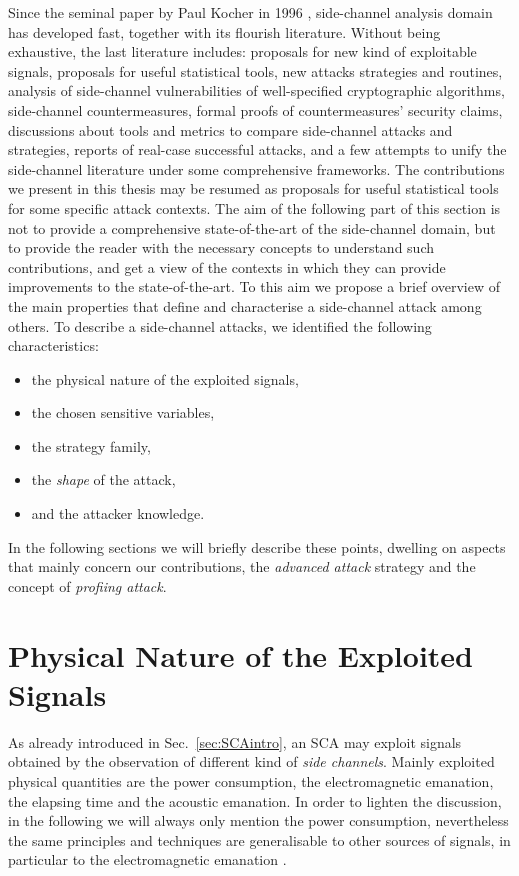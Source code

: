 Since the seminal paper by Paul Kocher in 1996 \cite{kocher1996timing}, side-channel analysis domain has developed fast, together with its flourish literature. Without being exhaustive, the last literature includes: proposals for new kind of exploitable signals, proposals for useful statistical tools, new attacks strategies and routines, analysis of side-channel vulnerabilities of well-specified cryptographic algorithms, side-channel countermeasures, formal proofs of countermeasures' security claims, discussions about tools and metrics to compare side-channel attacks and strategies, reports of real-case successful attacks, and a few attempts to unify the side-channel literature under some comprehensive frameworks. The contributions we present in this thesis may be resumed as proposals for useful statistical tools for some specific attack contexts. The aim of the following part of this section is not to provide a comprehensive state-of-the-art of the side-channel domain, but to provide the reader with the necessary concepts to understand such contributions, and get a view of the contexts in which they can provide improvements to the state-of-the-art. To this aim we propose a brief overview of the main properties that define and characterise a side-channel attack among others. To describe a side-channel attacks, we identified  the following characteristics: 
\begin{itemize}
\item the physical nature of the exploited signals,
\item the chosen sensitive variables,
\item the strategy family,
\item the \emph{shape} of the attack,
\item and the attacker knowledge.
\end{itemize} 

In the following sections we will briefly describe these points, dwelling on aspects that  mainly concern our contributions, \ie the \emph{advanced attack} strategy and the concept of \emph{profiing attack}. 

\section{Physical Nature of the Exploited Signals}\label{sec:physical_signals}
As already introduced in Sec.~\ref{sec:SCAintro}, an SCA may exploit signals obtained by the observation of different kind of \emph{side channels}. Mainly exploited physical quantities are the power consumption, the electromagnetic emanation, the elapsing time and the acoustic emanation. In order to lighten the discussion, in the following we will always only mention the power consumption, nevertheless the same principles and techniques are generalisable to other sources of signals, in particular to the electromagnetic emanation \cite{le2007analyses}.

